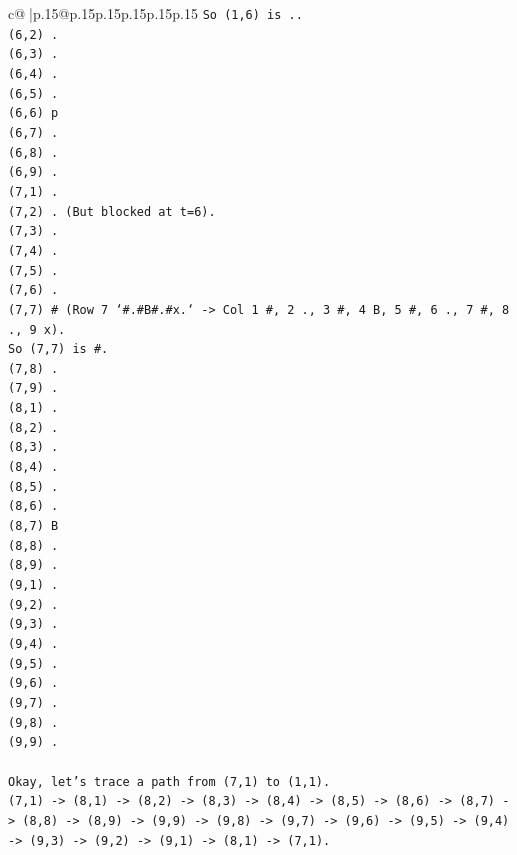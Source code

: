 \documentclass{article}
\begin{document}
{\begin{supertabular}{c@{$\;$}|p{.15\linewidth}@{}p{.15\linewidth}p{.15\linewidth}p{.15\linewidth}p{.15\linewidth}p{.15\linewidth}}
{{{\texttt{So (1,6) is ..} \\
\texttt{(6,2) .} \\
\texttt{(6,3) .} \\
\texttt{(6,4) .} \\
\texttt{(6,5) .} \\
\texttt{(6,6) p} \\
\texttt{(6,7) .} \\
\texttt{(6,8) .} \\
\texttt{(6,9) .} \\
\texttt{(7,1) .} \\
\texttt{(7,2) . (But blocked at t=6).} \\
\texttt{(7,3) .} \\
\texttt{(7,4) .} \\
\texttt{(7,5) .} \\
\texttt{(7,6) .} \\
\texttt{(7,7) \# (Row 7 `\#.\#B\#.\#x.` {-}> Col 1 \#, 2 ., 3 \#, 4 B, 5 \#, 6 ., 7 \#, 8 ., 9 x).} \\
\texttt{So (7,7) is \#.} \\
\texttt{(7,8) .} \\
\texttt{(7,9) .} \\
\texttt{(8,1) .} \\
\texttt{(8,2) .} \\
\texttt{(8,3) .} \\
\texttt{(8,4) .} \\
\texttt{(8,5) .} \\
\texttt{(8,6) .} \\
\texttt{(8,7) B} \\
\texttt{(8,8) .} \\
\texttt{(8,9) .} \\
\texttt{(9,1) .} \\
\texttt{(9,2) .} \\
\texttt{(9,3) .} \\
\texttt{(9,4) .} \\
\texttt{(9,5) .} \\
\texttt{(9,6) .} \\
\texttt{(9,7) .} \\
\texttt{(9,8) .} \\
\texttt{(9,9) .} \\
\\ 
\texttt{Okay, let's trace a path from (7,1) to (1,1).} \\
\texttt{(7,1) {-}> (8,1) {-}> (8,2) {-}> (8,3) {-}> (8,4) {-}> (8,5) {-}> (8,6) {-}> (8,7) {-}> (8,8) {-}> (8,9) {-}> (9,9) {-}> (9,8) {-}> (9,7) {-}> (9,6) {-}> (9,5) {-}> (9,4) {-}> (9,3) {-}> (9,2) {-}> (9,1) {-}> (8,1) {-}> (7,1).} \\
}}}
\end{supertabular}}
\end{document}

